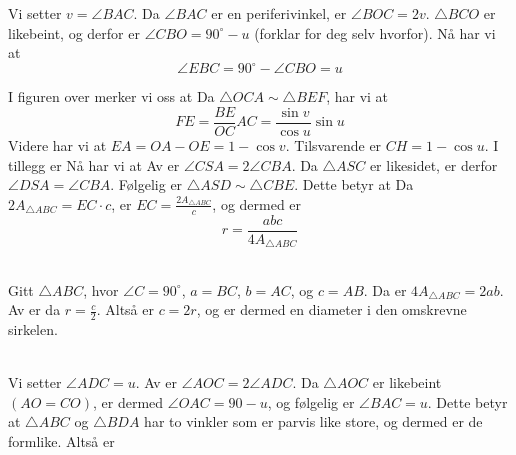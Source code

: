 Vi setter $ v=\angle BAC $.
Da $ \angle BAC $ er en periferivinkel, er $ \angle BOC=2v $. $ \triangle BCO $ er likebeint, og derfor er $ \angle CBO=90^\circ-u$ (forklar for deg selv hvorfor). Nå har vi at
\[ \angle EBC=90^\circ-\angle CBO=u \]

\newpage
{}
I figuren over merker vi oss at
Da $ \triangle OCA \sim \triangle BEF $, har vi at
\[ FE=\frac{BE}{OC}AC=\frac{\sin v}{\cos u}\sin u \]
Videre har vi at $ EA=OA-OE=1-\cos v $. Tilsvarende er $ CH=1-\cos u $. I tillegg er 
Nå har vi at
\newpage
{}
Av  er $ \angle CSA=2\angle CBA $. Da $ \triangle ASC $ er likesidet, er derfor $ \angle DSA=\angle CBA $. Følgelig er $ \triangle ASD\sim \triangle CBE $. Dette betyr at
Da $ 2A_{\triangle ABC}=EC\cdot c $, er $ EC=\frac{2A_{\triangle ABC}}{c} $, og dermed er
\[ r=\frac{abc}{4A_{\triangle ABC}} \]


 \\
Gitt $ \triangle ABC$, hvor $ \angle C=90^\circ $, $ a=BC $, $ b=AC $, og $ c=AB $. Da er $ 4A_{\triangle ABC}=2ab $.
Av  er da $  r=\frac{c}{2} $. Altså er $ c=2r $, og er dermed en diameter i den omskrevne sirkelen.

\\
Vi setter $ \angle ADC=u $. Av  er $ \angle AOC=2\angle ADC $. Da $ \triangle AOC $ er likebeint $ (AO=CO) $, er dermed $ \angle OAC= 90-u $, og følgelig er $ \angle BAC=u $. Dette betyr at $ \triangle ABC $ og $ \triangle BDA $ har to vinkler som er parvis like store, og dermed er de formlike. Altså er




